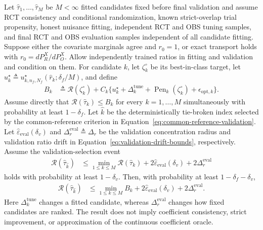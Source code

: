\begin{theorem}
\label{thm:cate-general-selected-risk}
Let $\widehat\tau_1,\ldots,\widehat\tau_M$ be $M<\infty$ fitted
candidates fixed before final validation and assume
RCT consistency and conditional randomization, known strict-overlap trial
propensity, honest nuisance fitting, independent RCT and OBS tuning samples,
and final RCT and OBS evaluation samples independent of all candidate fitting.
Suppose either the covariate marginals agree and $r_0=1$, or exact transport
holds with $r_0=dP_R^X/dP_O^X$. Allow independently trained ratios in fitting
and validation and condition on them. For candidate $k$, let
$\zeta_k^\circ$ be its best-in-class target, let
$u_k^\star\triangleq
u_{k,n_f,N_f}^\star(\widehat r_k;\delta_f/M)$, and define
\begin{align*}
B_k
&\triangleq\mathcal R(\zeta_k^\circ)
+C_k\{u_k^\star+\Delta_k^{\mathrm{tune}}
+\operatorname{Pen}_k(\zeta_k^\circ)+\epsilon_{\mathrm{opt},k}\}.
\end{align*}
Assume directly that
$\mathcal R(\widehat\tau_k)\leq B_k$ for every
$k=1,\ldots,M$ simultaneously with probability at least
$1-\delta_f$.
Let $\widehat k$ be the deterministically tie-broken index selected by the
common-reference criterion in Equation~\eqref{eq:common-reference-validation}.
Let $\widehat\varepsilon_{\mathrm{eval}}(\delta_v)$ and
$\Delta_r^{\mathrm{eval}}\triangleq\Delta_r$ be the validation concentration
radius and validation ratio drift in
Equation~\eqref{eq:validation-drift-bounds}, respectively. Assume the
validation-selection event
\begin{align*}
\mathcal R(\widehat\tau_{\widehat k})
&\leq \min_{1\leq k\leq M}\mathcal R(\widehat\tau_k)
+2\widehat\varepsilon_{\mathrm{eval}}(\delta_v)
+2\Delta_r^{\mathrm{eval}}
\end{align*}
holds with probability at least $1-\delta_v$. Then, with probability at least
$1-\delta_f-\delta_v$,
\begin{align}
\mathcal R(\widehat\tau_{\widehat k})
&\leq\min_{1\leq k\leq M}B_k
+2\widehat\varepsilon_{\mathrm{eval}}(\delta_v)
+2\Delta_r^{\mathrm{eval}}.
\label{eq:cate-general-selected-risk}
\end{align}
Here $\Delta_k^{\mathrm{tune}}$ changes a fitted candidate, whereas
$\Delta_r^{\mathrm{eval}}$ changes how fixed candidates are ranked.  The
result does not imply coefficient consistency, strict improvement, or
approximation of the continuous coefficient oracle.
\end{theorem}

